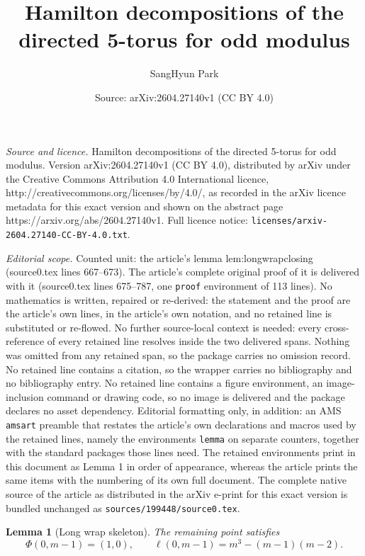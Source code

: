 \documentclass[10pt,a4paper]{amsart}
\title{Hamilton decompositions of the directed 5-torus for odd modulus}
\author{SangHyun Park}
\date{Source: arXiv:2604.27140v1 (CC BY 4.0)}
\newtheorem{lemma}{Lemma}
\begin{document}
\maketitle

\noindent\emph{Source and licence.} Hamilton decompositions of the directed 5-torus for odd modulus. Version arXiv:2604.27140v1 (CC BY 4.0), distributed by arXiv under the Creative Commons Attribution 4.0 International licence, http://creativecommons.org/licenses/by/4.0/, as recorded in the arXiv licence metadata for this exact version and shown on the abstract page https://arxiv.org/abs/2604.27140v1. Full licence notice: \texttt{licenses/arxiv-2604.27140-CC-BY-4.0.txt}.\par\smallskip

\noindent\textit{Editorial scope.} Counted unit: the article's lemma lem:longwrapclosing (source0.tex lines 667--673). The article's complete original proof of it is delivered with it (source0.tex lines 675--787, one \texttt{proof} environment of 113 lines). No mathematics is written, repaired or re-derived: the statement and the proof are the article's own lines, in the article's own notation, and no retained line is substituted or re-flowed.  No further source-local context is needed: every cross-reference of every retained line resolves inside the two delivered spans.  Nothing was omitted from any retained span, so the package carries no omission record.  No retained line contains a citation, so the wrapper carries no bibliography and no bibliography entry.  No retained line contains a figure environment, an image-inclusion command or drawing code, so no image is delivered and the package declares no asset dependency.  Editorial formatting only, in addition: an AMS \texttt{amsart} preamble that restates the article's own declarations and macros used by the retained lines, namely the environments \texttt{lemma} on separate counters, together with the standard packages those lines need.  The retained environments print in this document as Lemma 1 in order of appearance, whereas the article prints the same items with the numbering of its own full document.  The complete native source of the article as distributed in the arXiv e-print for this exact version is bundled unchanged as \texttt{sources/199448/source0.tex}.
\begin{lemma}[Long wrap skeleton]\label{lem:longwrapclosing}
The remaining point satisfies
\[
\Phi(0,m-1)=(1,0),\qquad
\ell(0,m-1)=m^3-(m-1)(m-2).
\]
\end{lemma}
\end{document}

